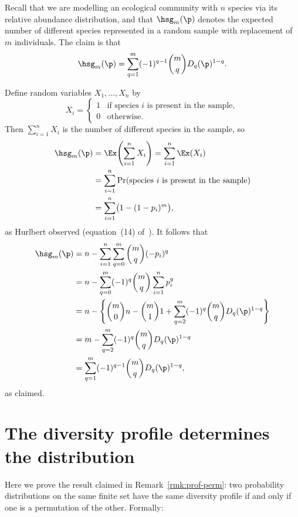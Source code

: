 Recall that we are modelling an ecological community with $n$ species via
its relative abundance distribution, and that $\hsg_m(\p)$ denotes the
expected number of different species represented in a random sample with
replacement of $m$ individuals.  The claim is that
\[
\hsg_m(\p)
=
\sum_{q = 1}^m (-1)^{q - 1} \binom{m}{q} D_q(\p)^{1 - q}.
\]

Define random variables $X_1, \ldots, X_n$ by
\[
X_i     
=
\begin{cases}
1       &\text{if species } i \text{ is present in the sample}, \\
0       &\text{otherwise}.
\end{cases}
\]
Then $\sum_{i = 1}^n X_i$ is the number of different species in the sample,
so
% 
\begin{align*}
\hsg_m(\p)      &
=
\Ex\Biggl( \sum_{i = 1}^n X_i \Biggr)  
=
\sum_{i = 1}^n \Ex(X_i) \\
&
=
\sum_{i = 1}^n \Pr(\text{species } i \text{ is present in the sample})  \\
&
=
\sum_{i = 1}^n \bigl( 1 - (1 - p_i)^m \bigr),
\end{align*}
% 
as Hurlbert%
%
% 
observed (equation~(14) of~\cite{Hurl}).  It follows that
% 
\begin{align*}
\hsg_m(\p)      &
=
n - \sum_{i = 1}^n \sum_{q = 0}^m \binom{m}{q} (-p_i)^q \\
&
=
n - \sum_{q = 0}^m (-1)^q \binom{m}{q} \sum_{i = 1}^n p_i^q     \\
&
=
n - \Biggl\{ 
\binom{m}{0} n - \binom{m}{1} 1 + 
\sum_{q = 2}^m (-1)^q \binom{m}{q} D_q(\p)^{1 - q}
\Biggr\}        \\
&
=
m - \sum_{q = 2}^m (-1)^q \binom{m}{q} D_q(\p)^{1 - q}  \\
&
=
\sum_{q = 1}^m (-1)^{q - 1} \binom{m}{q} D_q(\p)^{1 - q},
\end{align*}
% 
as claimed.


\section{The diversity profile determines the distribution}


Here we prove the result claimed in Remark~\ref{rmk:prof-perm}: two
probability distributions on the same finite set have the same diversity
profile if and only if one is a permutation of the other.  Formally:
\pagebreak

